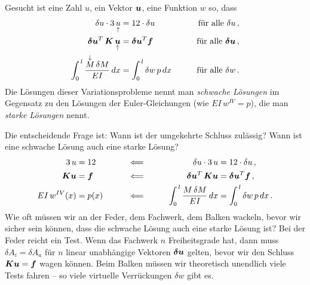 Gesucht ist eine Zahl $u$, ein Vektor $\mbox{\boldmath $u$}$, eine Funktion $w$ so, dass
\begin{alignat}{2}
\delta u \cdot 3\,\underset{\uparrow}{u} &= 12 \cdot \delta u &\qquad\mbox{f\"{u}r alle $\delta u$}\,, \nonumber \\
\mbox{\boldmath $\delta$} \mbox{\boldmath $u$}^T \,\mbox{\boldmath $K$}\,\underset{\uparrow}{\mbox{\boldmath $u$}} &=
\mbox{\boldmath $\delta$} \mbox{\boldmath $u$}^T \mbox{\boldmath $f$} &\qquad\mbox{f\"{u}r alle $\mbox{\boldmath $\delta$} \mbox{\boldmath $u$}$}\,, \nonumber \\
 \int_0^{\,l} \frac{\overset{\downarrow}{M}\,\delta M}{EI}\,dx &= \int_0^{\,l} \delta w\,p\,dx &\qquad\mbox{f\"{u}r alle $\delta
 w$}\,. \nonumber
\end{alignat}
Die L\"{o}sungen dieser Variationsprobleme nennt man {\em schwache L\"{o}sungen\/} im Gegensatz zu den L\"{o}sungen der Euler-Gleichungen (wie $EI\,w^{IV} = p$), die man {\em starke L\"{o}sungen\/} nennt.

Die entscheidende Frage ist: Wann ist der umgekehrte Schluss zul\"{a}ssig? Wann ist eine schwache L\"{o}sung auch eine starke L\"{o}sung?
\begin{alignat}{3}
3\,u &= 12  &&\qquad\Longleftarrow &\qquad \delta u \cdot 3\, u &= 12 \cdot \delta u\,, \nonumber \\
\mbox{\boldmath $K$} \mbox{\boldmath $u$} &= \mbox{\boldmath $f$} &&\qquad\Longleftarrow &\qquad\mbox{\boldmath $\delta$} \mbox{\boldmath $u$}^T \,\mbox{\boldmath $K$}\mbox{\boldmath $u$}
&= \mbox{\boldmath $\delta$} \mbox{\boldmath $u$}^T \mbox{\boldmath $f$}\,,\nonumber \\
EI\,w^{IV}(x) &= p(x)  &&\qquad\Longleftarrow &\qquad\int_0^{\,l} \frac{M\,\delta M}{EI}\,dx
&= \int_0^{\,l} \delta w\,p\,dx\,.\nonumber
\end{alignat}
Wie oft m\"{u}ssen wir an der Feder, dem Fachwerk, dem Balken wackeln, bevor wir sicher sein k\"{o}nnen, dass die schwache L\"{o}sung auch eine starke L\"{o}sung ist? Bei der Feder reicht ein Test. Wenn das Fachwerk $n$ Freiheitsgrade hat, dann muss $\delta A_i = \delta A_a$ f\"{u}r $n$ linear unabh\"{a}ngige Vektoren $\mbox{\boldmath $\delta$} \mbox{\boldmath $u$}$ gelten, bevor wir den Schluss $\mbox{\boldmath $K$}\mbox{\boldmath $u$} = \mbox{\boldmath $f$}$ wagen k\"{o}nnen. Beim Balken m\"{u}ssen wir theoretisch unendlich viele Tests fahren -- so viele virtuelle Verr\"{u}ckungen $\delta w$ gibt es.

